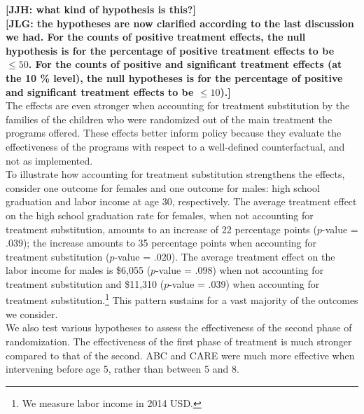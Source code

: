 \noindent \textbf{[JJH: what kind of hypothesis is this?]} \\ 
\noindent \textbf{[JLG: the hypotheses are now clarified according to the last discussion we had. For the counts of positive treatment effects, the null hypothesis is for the percentage of positive treatment effects to be $\leq 50$. For the counts of positive and significant treatment effects (at the 10 \% level), the null hypotheses is for the percentage of positive and significant treatment effects to be $\leq 10$).]}\\

\noindent The effects are even stronger when accounting for treatment substitution by the families of the children who were randomized out of the main treatment  the programs offered. These effects better inform policy because they evaluate the effectiveness of the programs with respect to a well-defined counterfactual, and not as implemented.\\ 

\noindent To illustrate how accounting for treatment substitution strengthens the effects, consider one outcome for females and one outcome for males: high school graduation and labor income at age 30, respectively. The average treatment effect on the high school graduation rate for females, when not accounting for treatment substitution, amounts to an increase of 22 percentage points ($p$-value = .039); the increase amounts to 35 percentage points when accounting for treatment substitution ($p$-value = .020). The average treatment effect on the labor income for males is \$6,055 ($p$-value = .098) when not accounting for treatment substitution and \$11,310 ($p$-value = .039) when accounting for treatment substitution.\footnote{We measure labor income in 2014 USD.} This pattern sustains for a vast majority of the outcomes we consider.\\

\noindent We also test various hypotheses to assess the effectiveness of the second phase of randomization. The effectiveness of the first phase of treatment is much stronger compared to that of the second. ABC and CARE were much more effective when intervening before age 5, rather than between 5 and 8.\\

